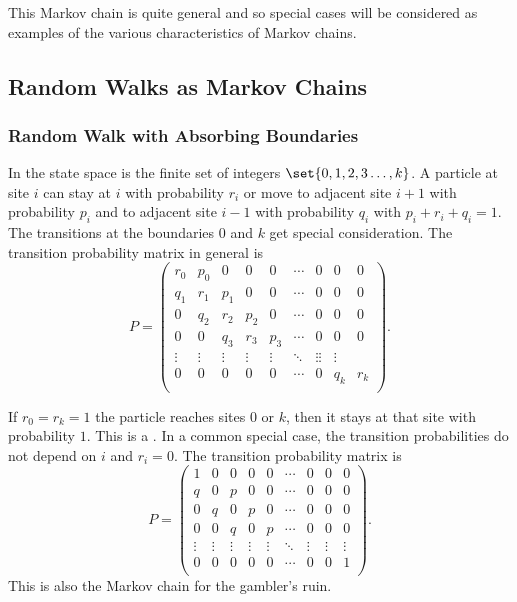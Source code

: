 \documentclass[12pt]{article}
\begin{document}
This Markov chain is quite general and so special cases will be
considered as examples of the various characteristics of Markov chains.

\subsection*{Random Walks as Markov Chains}

\subsubsection*{Random Walk with Absorbing Boundaries}

In  the state space is the finite set
of integers \( \set{0, 1, 2, 3 \dots, k} \).%
A particle at site \( i \) can stay at \( i \) with probability \( r_i \)
or move to adjacent site \( i+1 \) with probability \( p_i \) and to
adjacent site \( i-1 \) with probability \( q_i \) with \( p_i+r_i+q_i =
1 \).  The transitions at the boundaries \( 0 \) and \( k \) get special
consideration.  The transition probability matrix in general is
\[
    P =
    \begin{pmatrix}
        r_0 & p_0 & 0 & 0 & 0 & \cdots & 0 & 0 & 0 \\
        q_1 & r_1 & p_1 & 0 & 0 & \cdots & 0 & 0 & 0 \\
        0 & q_2 & r_2 & p_2 & 0 & \cdots & 0 & 0 & 0 \\
        0 & 0 & q_3 & r_3 & p_3 & \cdots & 0 & 0 & 0 \\
        \vdots & \vdots & \vdots & \vdots & \vdots & \ddots & \vdots
        \vdots & \vdots \\
        0 & 0 & 0 & 0 & 0 & \cdots & 0 & q_k & r_k \\
    \end{pmatrix}
    .
\]

If \( r_0 = r_k = 1 \) the particle reaches sites \( 0 \) or \( k \),
then it stays at that site with probability \( 1 \).  This is a .  In a common%
special case, the transition probabilities do not depend on \( i \) and \(
r_i = 0 \).  The transition probability matrix is
\[
    P =
    \begin{pmatrix}
        1 & 0 & 0 & 0 & 0 & \cdots & 0 & 0 & 0 \\
        q & 0 & p & 0 & 0 & \cdots & 0 & 0 & 0 \\
        0 & q & 0 & p & 0 & \cdots & 0 & 0 & 0 \\
        0 & 0 & q & 0 & p & \cdots & 0 & 0 & 0 \\
        \vdots & \vdots & \vdots & \vdots & \vdots & \ddots & \vdots &
        \vdots & \vdots \\
        0 & 0 & 0 & 0 & 0 & \cdots & 0 & 0 & 1 \\
    \end{pmatrix}
    .
\] This is also the Markov chain for the gambler's ruin.%
\end{document}
